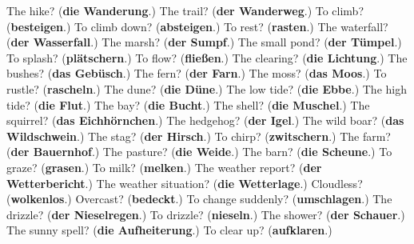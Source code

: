\begin{tcolorbox}[breakable,colback=teal!4,colframe=teal!35!black,title={Before you move on}]
The hike? (\textbf{die Wanderung}.) The trail? (\textbf{der Wanderweg}.) To climb? (\textbf{besteigen}.) To climb down? (\textbf{absteigen}.) To rest? (\textbf{rasten}.) The waterfall? (\textbf{der Wasserfall}.) The marsh? (\textbf{der Sumpf}.) The small pond? (\textbf{der Tümpel}.) To splash? (\textbf{plätschern}.) To flow? (\textbf{fließen}.) The clearing? (\textbf{die Lichtung}.) The bushes? (\textbf{das Gebüsch}.) The fern? (\textbf{der Farn}.) The moss? (\textbf{das Moos}.) To rustle? (\textbf{rascheln}.) The dune? (\textbf{die Düne}.) The low tide? (\textbf{die Ebbe}.) The high tide? (\textbf{die Flut}.) The bay? (\textbf{die Bucht}.) The shell? (\textbf{die Muschel}.) The squirrel? (\textbf{das Eichhörnchen}.) The hedgehog? (\textbf{der Igel}.) The wild boar? (\textbf{das Wildschwein}.) The stag? (\textbf{der Hirsch}.) To chirp? (\textbf{zwitschern}.) The farm? (\textbf{der Bauernhof}.) The pasture? (\textbf{die Weide}.) The barn? (\textbf{die Scheune}.) To graze? (\textbf{grasen}.) To milk? (\textbf{melken}.) The weather report? (\textbf{der Wetterbericht}.) The weather situation? (\textbf{die Wetterlage}.) Cloudless? (\textbf{wolkenlos}.) Overcast? (\textbf{bedeckt}.) To change suddenly? (\textbf{umschlagen}.) The drizzle? (\textbf{der Nieselregen}.) To drizzle? (\textbf{nieseln}.) The shower? (\textbf{der Schauer}.) The sunny spell? (\textbf{die Aufheiterung}.) To clear up? (\textbf{aufklaren}.)
\end{tcolorbox}
